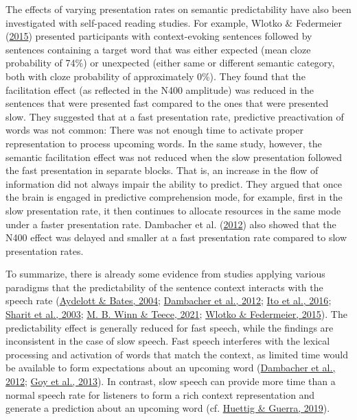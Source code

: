 \documentclass[a4paper, nobind]{templates/ociamthesis}
\begin{document}
The effects of varying presentation rates on semantic predictability have also been investigated with self-paced reading studies.
For example, Wlotko \& Federmeier (\protect\hyperlink{ref-Wlotko2015}{2015}) presented participants with context-evoking sentences followed by sentences containing a target word that was either expected (mean cloze probability of 74\%) or unexpected (either same or different semantic category, both with cloze probability of approximately 0\%).
They found that the facilitation effect (as reflected in the N400 amplitude) was reduced in the sentences that were presented fast compared to the ones that were presented slow.
They suggested that at a fast presentation rate, predictive preactivation of words was not common:
There was not enough time to activate proper representation to process upcoming words.
In the same study, however, the semantic facilitation effect was not reduced when the slow presentation followed the fast presentation in separate blocks.
That is, an increase in the flow of information did not always impair the ability to predict.
They argued that once the brain is engaged in predictive comprehension mode, for example, first in the slow presentation rate, it then continues to allocate resources in the same mode under a faster presentation rate.
Dambacher et al. (\protect\hyperlink{ref-Dambacher2012}{2012}) also showed that the N400 effect was delayed and smaller at a fast presentation rate compared to slow presentation rates.

To summarize, there is already some evidence from studies applying various paradigms that the predictability of the sentence context interacts with the speech rate (\protect\hyperlink{ref-Aydelott2004}{Aydelott \& Bates, 2004}; \protect\hyperlink{ref-Dambacher2012}{Dambacher et al., 2012}; \protect\hyperlink{ref-Ito2016}{Ito et al., 2016}; \protect\hyperlink{ref-Sharit2003}{Sharit et al., 2003}; \protect\hyperlink{ref-Winn2021}{M. B. Winn \& Teece, 2021}; \protect\hyperlink{ref-Wlotko2015}{Wlotko \& Federmeier, 2015}).
The predictability effect is generally reduced for fast speech, while the findings are inconsistent in the case of slow speech. Fast speech interferes with the lexical processing and activation of words that match the context, as limited time would be available to form expectations about an upcoming word (\protect\hyperlink{ref-Dambacher2012}{Dambacher et al., 2012}; \protect\hyperlink{ref-Goy2013}{Goy et al., 2013}).
In contrast, slow speech can provide more time than a normal speech rate for listeners to form a rich context representation and generate a prediction about an upcoming word (cf. \protect\hyperlink{ref-Huettig2019}{Huettig \& Guerra, 2019}).
\end{document}
